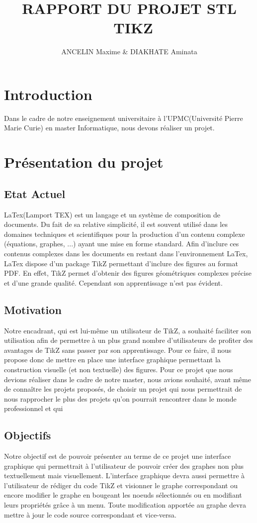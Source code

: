 \documentclass[a4paper]{report}
\title{RAPPORT DU PROJET STL \\ TIKZ}
\author{ANCELIN Maxime & DIAKHATE Aminata}
\begin{document}

 \maketitle
 \tableofcontents
 \newpage


 \newpage
 \section{Introduction}
  Dans le cadre de notre enseignement universitaire à l'UPMC(Université Pierre Marie Curie) en master Informatique, nous devons réaliser un projet. 
  
  \section{Présentation du projet}
  \subsection{Etat Actuel}
  LaTex(Lamport TEX) est un langage et un système de composition de documents. Du fait de sa relative simplicité, il est souvent utilisé dans les domaines techniques et scientifiques pour la production d'un contenu complexe (équations, graphes, ...) ayant une mise en forme standard. Afin d'inclure ces contenus complexes dans les documents en restant dans l'environnement LaTex, LaTex dispose d'un package TikZ permettant d'inclure des figures au format PDF. En effet, TikZ permet d'obtenir des figures géométriques complexes précise et d'une grande qualité. Cependant son apprentissage n'est pas évident. 
  \subsection{Motivation}
  Notre encadrant, qui est lui-même un utilisateur de TikZ, a souhaité faciliter son utilisation afin de permettre à un plus grand nombre d'utilisateurs de profiter des avantages de TikZ sans passer par son apprentissage. Pour ce faire, il nous propose donc de mettre en place une interface graphique permettant la construction  visuelle (et non textuelle) des figures.
  \newline
  Pour ce projet que nous devions réaliser dans le cadre de notre master, nous avions souhaité, avant même de 
connaître les projets proposés, de choisir un projet qui nous permettrait de nous rapprocher le plus des projets qu'on pourrait rencontrer dans le monde professionnel et qui 
  \subsection{Objectifs}
Notre objectif est de pouvoir présenter au terme de ce projet une interface graphique qui permettrait à l'utilisateur de pouvoir créer des graphes non plus textuellement mais visuellement. L'interface graphique devra aussi permettre à l'utilisateur de rédiger du code TikZ et visionner le graphe correspondant ou encore modifier le graphe en bougeant les noeuds sélectionnés ou en modifiant leurs propriétés grâce à un menu.
Toute modification apportée au graphe devra mettre à jour le code source correspondant et vice-versa. 
\end{document}
